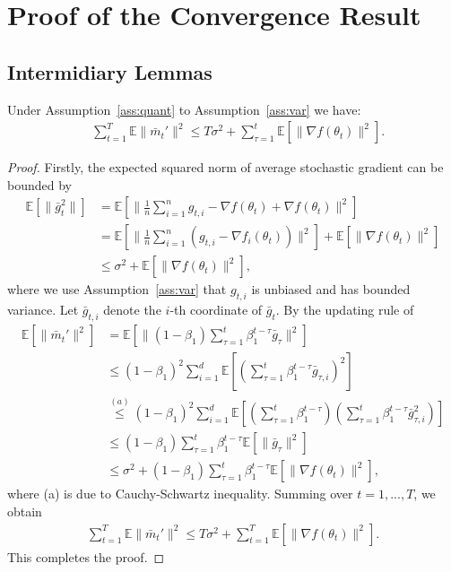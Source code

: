\documentclass[11pt]{article}
\begin{document}
\section{Proof of the Convergence Result}\label{app:proof}

\subsection{Intermidiary Lemmas}\label{app:lemmas}

\begin{Lemma} \label{lemma:m_t,m_t'}
Under Assumption~\ref{ass:quant} to Assumption~\ref{ass:var} we have:
\begin{align*}
    &\sum_{t=1}^T\mathbb E\|\bar m_t'\|^2\leq T\sigma^2+\sum_{\tau=1}^t \mathbb E[\|\nabla f(\theta_t)\|^2].
\end{align*}
\end{Lemma}

\begin{proof}
Firstly, the expected squared norm of average stochastic gradient can be bounded by
\begin{align*}
    \mathbb E[\|\bar g_t^2\|]&=\mathbb E[\|\frac{1}{n}\sum_{i=1}^n g_{t,i}-\nabla f(\theta_t)+\nabla f(\theta_t)\|^2]\\
    &=\mathbb E[\|\frac{1}{n}\sum_{i=1}^n (g_{t,i}-\nabla f_i(\theta_t))\|^2]+\mathbb E[\|\nabla f(\theta_t)\|^2]\\
    &\leq \sigma^2+\mathbb E[\|\nabla f(\theta_t)\|^2],
\end{align*}
where we use Assumption~\ref{ass:var} that $g_{t,i}$ is unbiased and has bounded variance. Let $\bar g_{t,i}$ denote the $i$-th coordinate of $\bar g_t$. By the updating rule of \algo\ 
\begin{align*}
    \mathbb E[\|\bar m_t'\|^2]&=\mathbb E[\|(1-\beta_1)\sum_{\tau=1}^t\beta_1^{t-\tau} \bar g_\tau\|^2]\\
    &\leq (1-\beta_1)^2\sum_{i=1}^d \mathbb E[(\sum_{\tau=1}^t\beta_1^{t-\tau} \bar g_{\tau,i})^2]\\
    &\overset{(a)}{\leq} (1-\beta_1)^2\sum_{i=1}^d \mathbb E[(\sum_{\tau=1}^t\beta_1^{t-\tau})(\sum_{\tau=1}^t\beta_1^{t-\tau} \bar g_{\tau,i}^2)]\\
    &\leq (1-\beta_1)\sum_{\tau=1}^t \beta_1^{t-\tau}\mathbb E[\|\bar g_\tau\|^2]\\
    &\leq \sigma^2+(1-\beta_1)\sum_{\tau=1}^t \beta_1^{t-\tau}\mathbb E[\|\nabla f(\theta_t)\|^2],
\end{align*}
where (a) is due to Cauchy-Schwartz inequality. Summing over $t=1,...,T$, we obtain
\begin{align*}
    \sum_{t=1}^T\mathbb E\|\bar m_t'\|^2\leq T\sigma^2+\sum_{t=1}^T \mathbb E[\|\nabla f(\theta_t)\|^2].
\end{align*}
This completes the proof.

\end{proof}
\end{document}
